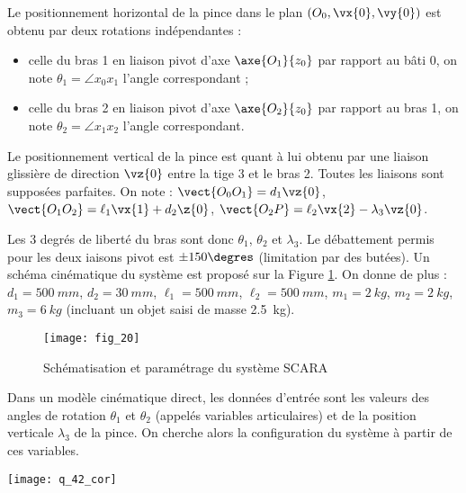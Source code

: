  Le positionnement horizontal de la pince dans le plan $\left(O_0,\vx{0},\vy{0}\right)$ est obtenu par deux rotations indépendantes : 
 \begin{itemize}
 \item celle du bras 1 en liaison pivot d'axe $\axe{O_1}{z_0}$ par rapport au bâti 0, on note $\theta_1 = \angle{x_0}{x_1}$ l'angle correspondant ;
 \item celle du bras 2 en liaison pivot d'axe $\axe{O_2}{z_0}$ par rapport au bras 1, on note $\theta_2 = \angle{x_1}{x_2}$ l'angle correspondant.
 \end{itemize}
 
Le positionnement vertical de la pince est quant à lui obtenu par une liaison glissière de direction
 $\vz{0}$ entre la tige 3 et le bras 2. 
Toutes les liaisons sont supposées parfaites.
On note : $\vect{O_0O_1} = d_1 \vz{0}$, 
$\vect{O_1O_2} = \ell_1 \vx{1}+d_2 \z{0}$, 
$\vect{O_2 P} =\ell_2\vx{2} - \lambda_3 \vz{0}$.

Les 3 degrés de liberté du bras sont donc $\theta_1$, $\theta_2$ et $\lambda_3$. Le débattement permis pour les deux iaisons pivot est $\pm 150\degres$ (limitation par des butées). 
Un schéma cinématique du système est proposé sur la Figure \ref{xens_2027_fig20}.
 On donne de plus :
 $d_1 =\SI{500}{mm}$, $d_2 =\SI{30}{mm}$, $\ell_1=\SI{500}{mm}$, $\ell_2 =\SI{500}{mm}$, 
$m_1 =\SI{2}{kg}$, $m_2=\SI{2}{kg}$, $m_3 =\SI{6}{kg}$ (incluant un objet saisi de masse \SI{2,5}{kg}).

\begin{figure}[!h]
\centering
\texttt{[image: fig\_20]}
\caption{Schématisation et paramétrage du système SCARA \label{xens_2027_fig20}}
\end{figure}




 Dans un modèle cinématique direct, les données d'entrée sont les valeurs des angles de rotation
$\theta_1$ et $\theta_2$ (appelés variables articulaires) et de la position verticale $\lambda_3$ de la pince. On cherche alors la configuration du système à partir de ces variables. 

  \ifprof
 \begin{corrige}
 \begin{center}
\texttt{[image: q\_42\_cor]}
\end{center}
 \end{corrige}
 \else
 \fi
 
